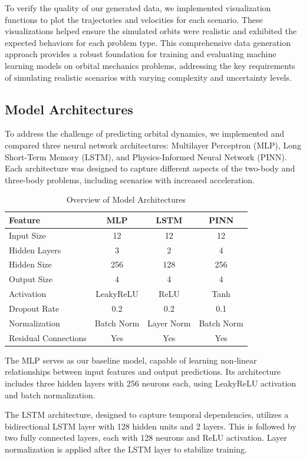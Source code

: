 \documentclass[12pt,a4paper]{article}
\begin{document}
To verify the quality of our generated data, we implemented visualization functions to plot the trajectories and velocities for each scenario. These visualizations helped ensure the simulated orbits were realistic and exhibited the expected behaviors for each problem type.
This comprehensive data generation approach provides a robust foundation for training and evaluating machine learning models on orbital mechanics problems, addressing the key requirements of simulating realistic scenarios with varying complexity and uncertainty levels.
\subsection{Model Architectures}

To address the challenge of predicting orbital dynamics, we implemented and compared three neural network architectures: Multilayer Perceptron (MLP), Long Short-Term Memory (LSTM), and Physics-Informed Neural Network (PINN). Each architecture was designed to capture different aspects of the two-body and three-body problems, including scenarios with increased acceleration.

\begin{table}[h]
\centering
\small
\caption{Overview of Model Architectures}
\label{tab:model-architectures}
\begin{tabular}{|l|c|c|c|}
\hline
\textbf{Feature} & \textbf{MLP} & \textbf{LSTM} & \textbf{PINN} \\
\hline
Input Size & 12 & 12 & 12 \\
Hidden Layers & 3 & 2 & 4 \\
Hidden Size & 256 & 128 & 256 \\
Output Size & 4 & 4 & 4 \\
Activation & LeakyReLU & ReLU & Tanh \\
Dropout Rate & 0.2 & 0.2 & 0.1 \\
Normalization & Batch Norm & Layer Norm & Batch Norm \\
Residual Connections & Yes & Yes & Yes \\
\hline
\end{tabular}
\end{table}

The MLP serves as our baseline model, capable of learning non-linear relationships between input features and output predictions. Its architecture includes three hidden layers with 256 neurons each, using LeakyReLU activation and batch normalization.

The LSTM architecture, designed to capture temporal dependencies, utilizes a bidirectional LSTM layer with 128 hidden units and 2 layers. This is followed by two fully connected layers, each with 128 neurons and ReLU activation. Layer normalization is applied after the LSTM layer to stabilize training.
\end{document}
